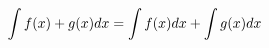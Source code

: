 \documentclass[preview]{standalone}
\begin{document}
\begin{align*}
\special{dvisvgm:raw <g id='unique000'>}\int f(x) + g(x) dx = \int f(x) dx + \int g(x) dx\special{dvisvgm:raw </g>}
\end{align*}
\end{document}
